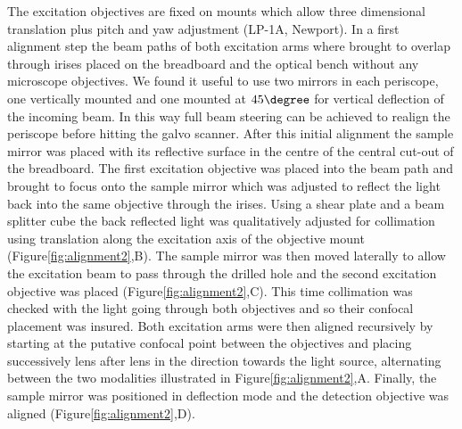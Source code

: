 \documentclass[12pt]{spieman}  %
\begin{document}
The excitation objectives are fixed on mounts which allow three dimensional translation plus pitch and yaw adjustment (LP-1A, Newport). In a first alignment step the beam paths of both excitation arms where brought to overlap through irises placed on the breadboard and the optical bench without any microscope objectives. We found it useful to use two mirrors in each periscope, one vertically mounted and one mounted at $45\degree$ for vertical deflection of the incoming beam. In this way full beam steering can be achieved to realign the periscope before hitting the galvo scanner. After this initial alignment the sample mirror was placed with its reflective surface in the centre of the central cut-out of the breadboard. The first excitation objective was placed into the beam path and brought to focus onto the sample mirror which was adjusted to reflect the light back into the same objective through the irises. Using a shear plate and a beam splitter cube the back reflected light was qualitatively adjusted for collimation using translation along the excitation axis of the objective mount (Figure\ref{fig:alignment2},B). The sample mirror was then moved laterally to allow the excitation beam to pass through the drilled hole and the second excitation objective was placed (Figure\ref{fig:alignment2},C). This time collimation was checked with the light going through both objectives and so their confocal placement was insured. Both excitation arms were then aligned recursively by starting at the putative confocal point between the objectives and placing successively lens after lens in the direction towards the light source, alternating between the two modalities illustrated in Figure\ref{fig:alignment2},A. Finally, the sample mirror was positioned in deflection mode and the detection objective was aligned (Figure\ref{fig:alignment2},D). 


\end{document}
